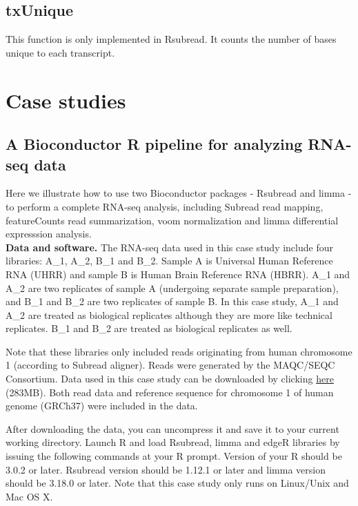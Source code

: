 \documentclass[12pt]{report}
\newcommand{\Subread}{\textsf{Subread}}
\newcommand{\Rsubread}{\textsf{Rsubread}}
\newcommand{\limma}{\textsf{limma}}
\newcommand{\edgeR}{\textsf{edgeR}}
\newcommand{\voom}{\textsf{voom}}
\newcommand{\featureCounts}{\textsf{featureCounts}}
\newcommand{\R}{\textsf{R}}
\begin{document}
\section{txUnique}

This function is only implemented in {\Rsubread}. It counts the number of bases unique to each transcript.

\chapter{Case studies}

\section{A Bioconductor R pipeline for analyzing RNA-seq data}

Here we illustrate how to use two Bioconductor packages - {\Rsubread} and {\limma} - to perform a complete RNA-seq analysis, including {\Subread} read mapping, {\featureCounts} read summarization, {\voom} normalization and {\limma} differential expresssion analysis.\\

{\noindent\bf Data and software.} The RNA-seq data used in this case study include four libraries: A\_1, A\_2, B\_1 and B\_2.
Sample A is Universal Human Reference RNA (UHRR) and sample B is Human Brain Reference RNA (HBRR).
A\_1 and A\_2 are two replicates of sample A (undergoing separate sample preparation), and B\_1 and B\_2 are two replicates of sample B.
In this case study, A\_1 and A\_2 are treated as biological replicates although they are more like technical replicates.
B\_1 and B\_2 are treated as biological replicates as well.

Note that these libraries only included reads originating from human chromosome 1 (according to {\Subread} aligner).
Reads were generated by the MAQC/SEQC Consortium.
Data used in this case study can be downloaded by clicking \href{https://latrobeuni-my.sharepoint.com/:u:/g/personal/yliao_ltu_edu_au/ESba1-VojYlMlQHVXxfc1d4BrONjXa_1qd4e1qz97tIe-w?e=nnYXyV}{here} (283MB).
Both read data and reference sequence for chromosome 1 of human genome (GRCh37) were included in the data.

After downloading the data, you can uncompress it and save it to your current working directory.
Launch {\R} and load {\Rsubread}, {\limma} and {\edgeR} libraries by issuing the following commands at your R prompt.
Version of your {\R} should be 3.0.2 or later.
{\Rsubread} version should be 1.12.1 or later and {\limma} version should be 3.18.0 or later.
Note that this case study only runs on Linux/Unix and Mac OS X.
\end{document}
